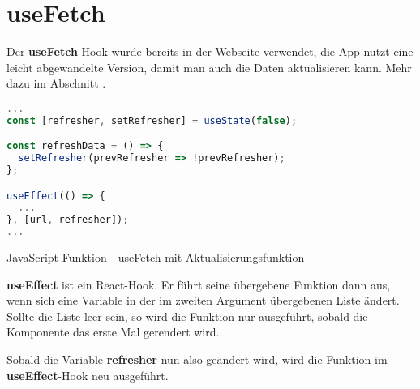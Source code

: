 \section{useFetch}
Der \textbf{useFetch}-Hook wurde bereits in der Webseite verwendet, die App nutzt eine leicht abgewandelte
Version, damit man auch die Daten aktualisieren kann. Mehr dazu im Abschnitt .

\begin{code}[htp]
\begin{lstlisting}[firstnumber=1,language=JavaScript, style=JSX]
...
const [refresher, setRefresher] = useState(false);

const refreshData = () => {
  setRefresher(prevRefresher => !prevRefresher);
};

useEffect(() => {
  ...
}, [url, refresher]);
...
\end{lstlisting}
\caption{JavaScript Funktion - useFetch mit Aktualisierungsfunktion}
\end{code}

\textbf{useEffect} ist ein React-Hook. Er führt seine übergebene Funktion dann aus, wenn sich eine Variable
in der im zweiten Argument übergebenen Liste ändert. Sollte die Liste leer sein, so wird die
Funktion nur ausgeführt, sobald die Komponente das erste Mal gerendert wird.

Sobald die Variable \textbf{refresher} nun also geändert wird, wird die Funktion im \textbf{useEffect}-Hook neu
ausgeführt.